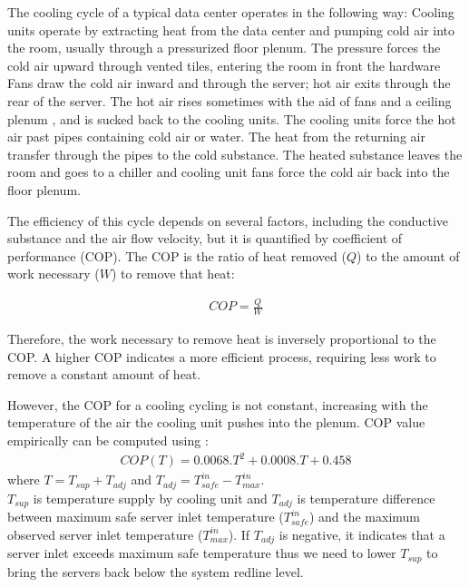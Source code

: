 \documentclass[JIP]{ipsj}
\begin{document}
The cooling cycle of a typical data center operates in the following way:
Cooling units operate by extracting heat from the data center and pumping cold air into the room, usually through a pressurized floor plenum.
The pressure forces the cold air upward through vented tiles, entering the room in front the hardware
Fans draw the cold air inward and through the server; hot air exits through the rear of the server.
The hot air rises sometimes with the aid of fans and a ceiling plenum , and is sucked back to the cooling units.
The cooling units force the hot air past pipes containing cold air or water. 
The heat from the returning air transfer through the pipes to the cold substance. 
The heated substance leaves the room and goes to a chiller and cooling unit fans force the cold air back into the floor plenum. 

The efficiency of this cycle depends on several factors, including the conductive substance and the air flow velocity, but it is quantified by coefficient of performance (COP).
The COP is the ratio of heat removed ($Q$) to the amount of work necessary ($W$) to remove that heat:

\begin{eqnarray}\label{eqn:cop}
	COP=\frac{Q}{W}
\end{eqnarray}

Therefore, the work necessary to remove heat is inversely proportional to the COP.  
A higher COP indicates a more efficient process, requiring less work to remove a constant amount of heat.

However, the COP for a cooling cycling is not constant, increasing with the temperature of the air the cooling unit pushes into the plenum.  
COP value empirically can be computed using \cite{}:
\begin{eqnarray}\label{eqn:copt}
	COP(T) = 0.0068.T^2 + 0.0008.T + 0.458
\end{eqnarray}
where $T = T_{sup} + T_{adj}$ and $T_{adj} = T_{safe}^{in}-T_{max}^{in}$. \\
$T_{sup}$ is temperature supply by cooling unit and $T_{adj}$ is temperature difference between maximum safe server inlet temperature ($T_{safe}^{in}$) and the maximum observed server inlet temperature ($T_{max}^{in}$).
If $T_{adj}$ is negative, it indicates that a server inlet exceeds maximum safe temperature thus we need to lower $T_{sup}$ to bring the servers back below the system redline level.
\end{document}
